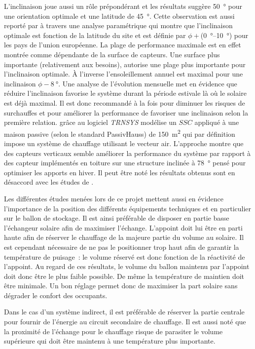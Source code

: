 L’inclinaison joue aussi un rôle prépondérant et les résultats suggère \SI{50}{\degree}
pour une orientation optimale et une latitude de \SI{45}{\degree}. Cette observation est
aussi reporté par \textcite{Shariah2002587} à travers une analyse paramétrique qui montre
que l’inclinaison optimale est fonction de la latitude du site et est définie par
$\phi + $(\SIrange{0}{10}{\degree}) pour les pays de l’union européenne. La plage de performance
maximale est en effet montrée comme dépendante de la surface de capteurs.
Une surface plus importante (relativement aux besoins), autorise une plage plus importante
pour l’inclinaison optimale. À l’inverse l’ensoleillement annuel est maximal pour
une inclinaison $\phi - \SI{8}{\degree}$. Une analyse de l’évolution mensuelle met
en évidence que réduire l’inclinaison favorise le système durant la période estivale
là où le solaire est déjà maximal. Il est donc recommandé à la fois pour diminuer
les risques de surchauffes et pour améliorer la performance de favoriser une
inclinaison selon la première relation.
\textcite{Badescu2006129} grâce au logiciel \textit{TRNSYS} modélise un $SSC$
appliqué à une maison passive (selon le standard PassivHauss) de \SI{150}{\metre\squared}
qui par définition impose un système de chauffage utilisant le vecteur air. L’approche montre que des
capteurs verticaux semble améliorer la performance du système par rapport à des
capteur implémentés en toiture sur une structure inclinée à \SI{78}{\degree} pensé pour optimiser les apports
en hiver. Il peut être noté les résultats obtenus sont en désaccord avec les études
de \textcite{Task26C2007,Shariah2002587}.

Les différentes études menées lors de ce projet mettent aussi en évidence l’importance
de la position des différents équipements techniques et en particulier sur le ballon
de stockage. Il est ainsi préférable de disposer en partie basse l’échangeur solaire
afin de maximiser l’échange. L’appoint doit lui être en parti haute afin de réserver
le chauffage de la majeure partie du volume au solaire. Il est cependant nécessaire
de ne pas le positionner trop haut afin de garantir la température de puisage~: le volume
réservé est donc fonction de la réactivité de l’appoint.
Au regard de ces résultats, le volume du ballon maintenu par l’appoint doit donc
être le plus faible possible. De même la température de maintien doit être minimale.
Un bon réglage permet donc de maximiser la part solaire sans dégrader le confort des occupants.

Dans le cas d’un système indirect, il est préférable de réserver la partie centrale
pour fournir de l’énergie au circuit secondaire de chauffage. Il est aussi noté que
la proximité de l’échange pour le chauffage risque de parasiter le volume supérieure
qui doit être maintenu à une température plus importante.

